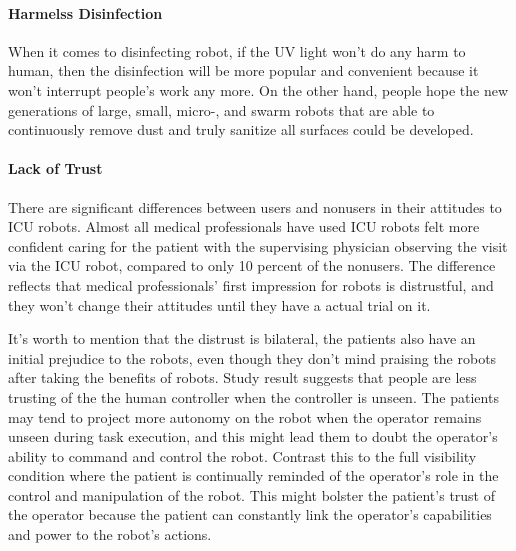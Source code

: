 \documentclass[a4paper]{article}
\begin{document}
\paragraph{Harmelss Disinfection} 
    When it comes to disinfecting robot, if the UV light won't do any harm to human, then the disinfection will be more popular and convenient because it won't interrupt people's work any more. On the other hand, people hope the new generations of large, small, micro-, and swarm robots that are able to continuously remove dust and truly sanitize all surfaces could be developed\cite{34}.

\paragraph{Lack of Trust}
    There are significant differences between users and nonusers in their attitudes to ICU robots. Almost all medical professionals have used ICU robots felt more confident caring for the patient with the supervising physician observing the visit via the ICU robot, compared to only 10 percent of the nonusers. The difference reflects that medical professionals' first impression for robots is distrustful, and they won't change their attitudes until they have a actual trial on it. 
\par 
    It's worth to mention that the distrust is bilateral, the patients also have an initial prejudice to the robots, even though they don't mind praising the robots after taking the benefits of robots. Study result suggests that people are less trusting of the the human controller when the controller is unseen\cite{29}. The patients may tend to project more autonomy on the robot when the operator remains unseen during task execution, and this might lead them to doubt the operator's ability to command and control the robot. Contrast this to the full visibility condition where the patient is continually reminded of the operator's role in the control and manipulation of the robot. This might bolster the patient's trust of the operator because the patient can constantly link the operator's capabilities and power to the robot's actions.
\end{document}
